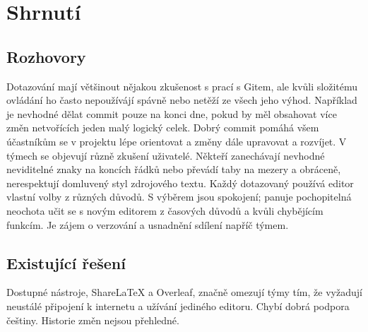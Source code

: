 \section{Shrnutí}

\subsection{Rozhovory}

Dotazování mají většinout nějakou zkušenost s prací s Gitem, ale kvůli složitému ovládání ho často nepoužívájí spávně nebo netěží ze všech jeho výhod. Například je nevhodné dělat commit pouze na konci dne, pokud by měl obsahovat více změn netvořících jeden malý logický celek. Dobrý commit pomáhá všem účastníkům se v projektu lépe orientovat a změny dále upravovat a rozvíjet. V týmech se objevují různě zkušení uživatelé. Někteří zanechávají nevhodné neviditelné znaky na koncích řádků nebo převádí taby na mezery a obráceně, nerespektují domluvený styl zdrojového textu. Každý dotazovaný používá editor vlastní volby z různých důvodů. S výběrem jsou spokojení; panuje pochopitelná neochota učit se s novým editorem z časových důvodů a kvůli chybějícím funkcím. Je zájem o verzování a usnadnění sdílení napříč týmem.

\subsection{Existující řešení}

Dostupné nástroje, ShareLaTeX a Overleaf, značně omezují týmy tím, že vyžadují neustálé připojení k internetu a užívání jediného editoru. Chybí dobrá podpora češtiny. Historie změn nejsou přehledné.